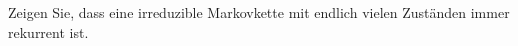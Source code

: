 \begin{Exercise}[label=ex:4.7]
Zeigen Sie, dass eine irreduzible Markovkette mit endlich vielen Zuständen immer rekurrent ist.
\end{Exercise}
\begin{Answer}
\end{Answer}

